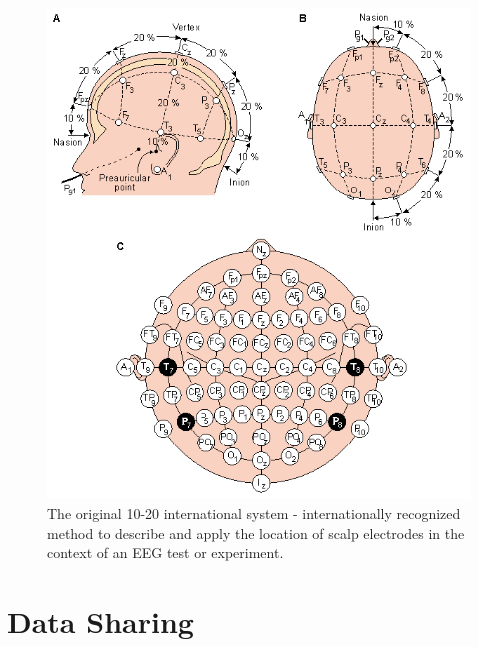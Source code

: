 \begin{figure}
	\centering
	\includegraphics[scale=0.4]{obrazky/ElectrodePositions1020.png}
	\caption{The original 10-20 international system - internationally recognized method to describe and apply the location of scalp electrodes in the context of an EEG test or experiment. \cite{BCI2000}}
	\label{10-20}
\end{figure}

\section{Data Sharing}

